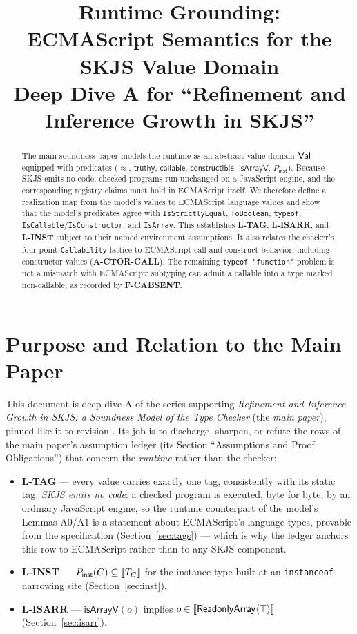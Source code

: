 \documentclass[11pt]{article}
\title{Runtime Grounding:\\
ECMAScript Semantics for the SKJS Value Domain\\
{\large Deep Dive A for ``Refinement and Inference Growth in SKJS''}}
\author{}
\date{\skjspin}
\begin{document}
\maketitle

\begin{abstract}
The main soundness paper models the runtime as an abstract value domain
$\mathsf{Val}$ equipped with predicates ($\approx$, $\mathsf{truthy}$,
$\mathsf{callable}$, $\mathsf{constructible}$, $\mathsf{isArrayV}$,
$P_{\mathsf{inst}}$). Because SKJS emits no code, checked programs run
unchanged on a JavaScript engine, and the corresponding registry claims must
hold in ECMAScript itself. We therefore define a realization map from the
model's values to ECMAScript language values and show that the model's
predicates agree with \texttt{IsStrictlyEqual}, \texttt{ToBoolean},
\texttt{typeof}, \texttt{IsCallable}/\texttt{IsConstructor}, and
\texttt{IsArray}. This establishes \textbf{L-TAG}, \textbf{L-ISARR}, and
\textbf{L-INST} subject to their named environment assumptions. It also
relates the checker's four-point \texttt{Callability} lattice to ECMAScript
call and construct behavior, including constructor values
(\textbf{A-CTOR-CALL}). The remaining \texttt{typeof "function"} problem is
not a mismatch with ECMAScript: subtyping can admit a callable into a type
marked non-callable, as recorded by \textbf{F-CABSENT}.
\end{abstract}

\tableofcontents

\section{Purpose and Relation to the Main Paper}
\label{sec:purpose}

This document is deep dive A of the series supporting
\emph{Refinement and Inference Growth in SKJS: a Soundness Model of the
Type Checker} (the \emph{main paper}), pinned like it to revision
\texttt{\skjspinhash}. Its job is to discharge, sharpen, or refute the rows of
the main paper's assumption ledger (its Section ``Assumptions and Proof
Obligations'') that concern the \emph{runtime} rather than the checker:

\begin{itemize}
\item \textbf{L-TAG} — every value carries exactly one
  tag, consistently with its static tag. \emph{SKJS emits no code}: a
  checked program is executed, byte for byte, by an ordinary JavaScript
  engine, so the runtime counterpart of the model's Lemmas A0/A1 is a
  statement about ECMAScript's language types, provable from the
  specification (Section~\ref{sec:tags}) — which is why the ledger anchors
  this row to ECMAScript rather than to any SKJS component.
\item \textbf{L-INST} —
  $P_{\mathsf{inst}}(C) \subseteq \llbracket T_C \rrbracket$ for the instance type built at
  an \texttt{instanceof} narrowing site (Section~\ref{sec:inst}).
\item \textbf{L-ISARR} —
  $\mathsf{isArrayV}(o)$ implies
  $o \in \llbracket \mathsf{ReadonlyArray}\langle\top\rangle \rrbracket$
  (Section~\ref{sec:isarr}).
\end{itemize}
\end{document}
